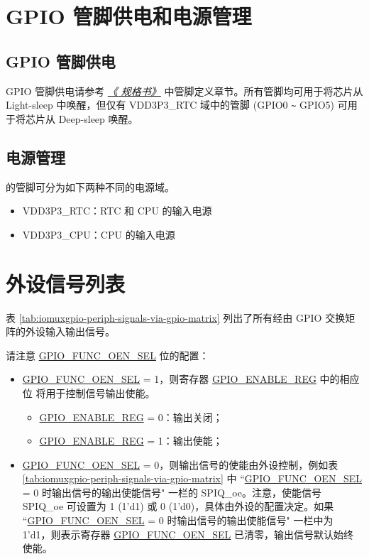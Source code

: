 \documentclass[main\_\_CN.tex]{subfiles}
\begin{document}
\section{GPIO 管脚供电和电源管理}\label{I/O Pad Power Supplies}

\subsection{GPIO 管脚供电}
GPIO 管脚供电请参考  {\it{\href{https://www.espressif.com/sites/default/files/documentation/esp32-c3_datasheet_en.pdf}{《\chipname{} 规格书》}}} 中管脚定义章节。所有管脚均可用于将芯片从 Light-sleep 中唤醒，但仅有 VDD3P3\_RTC 域中的管脚 (GPIO0 \verb+~+ GPIO5) 可用于将芯片从 Deep-sleep 唤醒。

\subsection{电源管理}

\chipname{} 的管脚可分为如下两种不同的电源域。

\begin{itemize}
    \item VDD3P3\_RTC：RTC 和 CPU 的输入电源
    \item VDD3P3\_CPU：CPU 的输入电源
\end{itemize}

\section{外设信号列表}
\label{sec:peripheral_signals}

表 \ref{tab:iomuxgpio-periph-signals-via-gpio-matrix} 列出了所有经由 GPIO 交换矩阵的外设输入输出信号。

请注意 \hyperref[fielddesc:GPIOFUNCNOENSEL]{GPIO\_FUNC\_OEN\_SEL} 位的配置：

\begin{itemize}
    \item \hyperref[fielddesc:GPIOFUNCNOENSEL]{GPIO\_FUNC\_OEN\_SEL} = 1，则寄存器 \hyperref[regdesc:GPIOENABLEREG]{GPIO\_ENABLE\_REG} 中的相应位   将用于控制信号输出使能。
    \begin{itemize}
        \item \hyperref[regdesc:GPIOENABLEREG]{GPIO\_ENABLE\_REG} = 0：输出关闭；
        \item \hyperref[regdesc:GPIOENABLEREG]{GPIO\_ENABLE\_REG} = 1：输出使能；
    \end{itemize}
    \item \hyperref[fielddesc:GPIOFUNCNOENSEL]{GPIO\_FUNC\_OEN\_SEL} = 0，则输出信号的使能由外设控制，例如表 \ref{tab:iomuxgpio-periph-signals-via-gpio-matrix} 中 ``\hyperref[fielddesc:GPIOFUNCNOENSEL]{GPIO\_FUNC\_OEN\_SEL} = 0 时输出信号的输出使能信号" 一栏的 SPIQ\_oe。注意，使能信号 SPIQ\_oe 可设置为 1 (1'd1) 或 0 (1'd0)，具体由外设的配置决定。如果 ``\hyperref[fielddesc:GPIOFUNCNOENSEL]{GPIO\_FUNC\_OEN\_SEL} = 0 时输出信号的输出使能信号" 一栏中为 1'd1，则表示寄存器 \hyperref[fielddesc:GPIOFUNCNOENSEL]{GPIO\_FUNC\_OEN\_SEL} 已清零，输出信号默认始终使能。
\end{itemize}
\end{document}
